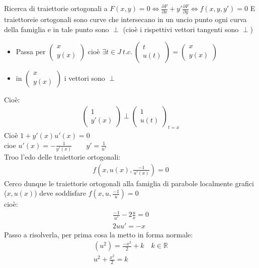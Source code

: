 \documentclass[a4paper, oneside]{article}
\begin{document}
Ricerca di traiettorie ortogonali a $F(x,y) = 0 \Leftrightarrow \frac{\partial F}{\partial x} + y' \frac{\partial F}{\partial y} \Leftrightarrow f(x,y,y') = 0$
E traiettoreie ortogonali sono curve che intersecano in un uncio punto ogni curva della famiglia e in tale punto sono $\perp$ (cioè i rispettivi vettori tangenti sono $\perp$)
\begin{itemize}
    \item Passa per $\begin{pmatrix} x \\ y(x) \end{pmatrix}$ cioè $\exists t \in J \ t.c. \ \begin{pmatrix} t \\ u(t) \end{pmatrix} = \begin{pmatrix} x \\ y(x) \end{pmatrix}$
    \item in $\begin{pmatrix} x \\ y(x) \end{pmatrix}$ i vettori sono $\perp$
\end{itemize}
Cioè:
\begin{gather*}
    \begin{pmatrix}
        1\\
        y'(x)
    \end{pmatrix} \perp \begin{pmatrix}
        1\\
        u(t)
    \end{pmatrix}_{t = x}
\end{gather*}
Cioè $1+y'(x) u'(x) = 0$\\
cioe $u'(x) = -\frac{1}{y'(x)} \qquad y' = \frac{1}{u'}$\\
Troo l'edo delle traiettorie ortogonali:
\begin{gather*}
    f(x,u(x), \frac{-1}{u'(x)}) = 0
\end{gather*}
Cerco dunque le traiettorie ortogonali alla famiglia di parabole localmente grafici ($x,u(x)$) deve soddisfare $f(x,u,\frac{-1}{u}) = 0$\\
cioè:
\begin{gather*}
    \frac{-1}{u'} -2 \frac{u}{x} = 0\\
    2u u' = -x
\end{gather*}
Passo a risolverla, per prima cosa la metto in forma normale:
\begin{gather*}
    (u^2) = \frac{-x^2}{2} +k \quad k \in \mathbb{R}\\ 
    u^2 + \frac{x^2}{2} = k
\end{gather*}
\end{document}
